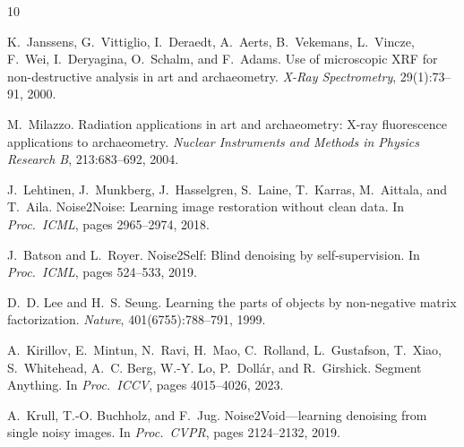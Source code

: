 \documentclass[twocolumn,11pt]{article}
\begin{document}
\begin{thebibliography}{10}

K.~Janssens, G.~Vittiglio, I.~Deraedt, A.~Aerts, B.~Vekemans, L.~Vincze,
  F.~Wei, I.~De\-rya\-gina, O.~Schalm, and F.~Adams.
\newblock Use of microscopic {XRF} for non-destructive analysis in art and
  archaeometry.
\newblock \emph{X-Ray Spectrometry}, 29(1):73--91, 2000.

M.~Milazzo.
\newblock Radiation applications in art and archaeometry: {X}-ray fluorescence
  applications to archaeometry.
\newblock \emph{Nuclear Instruments and Methods in Physics Research B},
  213:683--692, 2004.

J.~Lehtinen, J.~Munkberg, J.~Hasselgren, S.~Laine, T.~Karras, M.~Aittala,
  and T.~Aila.
\newblock Noise2{N}oise: Learning image restoration without clean data.
\newblock In \emph{Proc.\ ICML}, pages 2965--2974, 2018.

J.~Batson and L.~Royer.
\newblock Noise2{S}elf: Blind denoising by self-supervision.
\newblock In \emph{Proc.\ ICML}, pages 524--533, 2019.

D.~D. Lee and H.~S. Seung.
\newblock Learning the parts of objects by non-negative matrix factorization.
\newblock \emph{Nature}, 401(6755):788--791, 1999.

A.~Kirillov, E.~Mintun, N.~Ravi, H.~Mao, C.~Rolland, L.~Gustafson,
  T.~Xiao, S.~Whitehead, A.~C. Berg, W.-Y. Lo, P.~Doll\'{a}r, and
  R.~Girshick.
\newblock Segment {A}nything.
\newblock In \emph{Proc.\ ICCV}, pages 4015--4026, 2023.

A.~Krull, T.-O. Buchholz, and F.~Jug.
\newblock Noise2{V}oid---learning denoising from single noisy images.
\newblock In \emph{Proc.\ CVPR}, pages 2124--2132, 2019.

\end{thebibliography}
\end{document}
